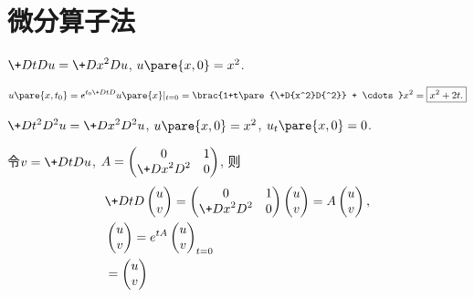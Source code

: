 \documentclass[hidelinks]{ctexart}
\begin{document}
\section{微分算子法} %
\label{sec:微分算子法}

\begin{ex}
    $\displaystyle \+DtDu = \+D{x^2}D{u}$, $u\pare{x,0} = x^2$.
\end{ex}
\begin{solution}
    $\displaystyle u\pare{x,t_0} = e^{t_0\+DtD{}}u\pare{x}\vert_{t=0} = \brac{1+t\pare{\+D{x^2}D{^2}} + \cdots} x^2 = \boxed{x^2 + 2t.}$
\end{solution}
\begin{ex}
    $\displaystyle \+D{t^2}{D^2 u} = \+D{x^2}D{^2u}$, $u\pare{x,0} = x^2$, $u_t\pare{x,0} = 0$.
\end{ex}
\begin{solution}
    令$\displaystyle v = \+DtDu$, $\displaystyle A = \begin{pmatrix}
        0 & 1 \\
        \displaystyle \+D{x^2}D{^2} & 0
    \end{pmatrix}$, 则
    \begin{align*}
        & \+DtD{}\begin{pmatrix}
            u \\ v
        \end{pmatrix} = \begin{pmatrix}
            0 & 1 \\
            \displaystyle \+D{x^2}D{^2} & 0
        \end{pmatrix}\begin{pmatrix}
            u \\ v
        \end{pmatrix} = A \begin{pmatrix}
            u \\ v
        \end{pmatrix}, \\
        & \begin{pmatrix}
            u \\ v
        \end{pmatrix} = e^{tA}\begin{pmatrix}
            u \\ v
        \end{pmatrix}_{t=0} \\ &= \begin{pmatrix}
            u \\ v

\end{pmatrix}
\end{align*}
\end{solution}
\end{document}
